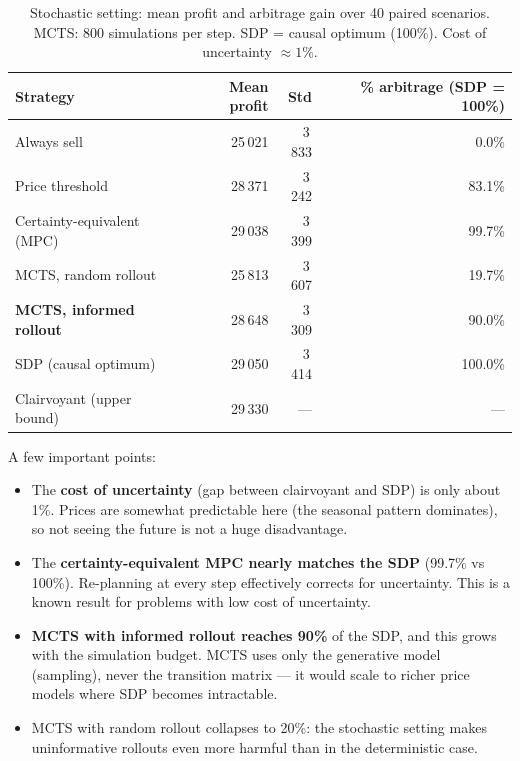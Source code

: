 \documentclass[12pt,a4paper]{article}
\begin{document}
\begin{table}[H]
  \centering
  \caption{Stochastic setting: mean profit and arbitrage gain over 40 paired
           scenarios. MCTS: 800 simulations per step.
           SDP = causal optimum (100\%). Cost of uncertainty $\approx 1\%$.}
  \label{tab:stoch_results}
  \begin{tabular}{lrrr}
    \toprule
    Strategy & Mean profit & Std & \% arbitrage (SDP = 100\%) \\
    \midrule
    Always sell                & 25\,021 & 3\,833 &   0.0\% \\
    Price threshold            & 28\,371 & 3\,242 &  83.1\% \\
    Certainty-equivalent (MPC) & 29\,038 & 3\,399 &  99.7\% \\
    MCTS, random rollout       & 25\,813 & 3\,607 &  19.7\% \\
    \textbf{MCTS, informed rollout} & 28\,648 & 3\,309 & 90.0\% \\
    SDP (causal optimum)       & 29\,050 & 3\,414 & 100.0\% \\
    \midrule
    Clairvoyant (upper bound)  & 29\,330 & --- & --- \\
    \bottomrule
  \end{tabular}
\end{table}

A few important points:
\begin{itemize}
  \item The \textbf{cost of uncertainty} (gap between clairvoyant and SDP)
    is only about 1\%. Prices are somewhat predictable here (the seasonal
    pattern dominates), so not seeing the future is not a huge disadvantage.
  \item The \textbf{certainty-equivalent MPC nearly matches the SDP} (99.7\%
    vs 100\%). Re-planning at every step effectively corrects for uncertainty.
    This is a known result for problems with low cost of uncertainty.
  \item \textbf{MCTS with informed rollout reaches 90\%} of the SDP, and this
    grows with the simulation budget. MCTS uses only the generative model
    (sampling), never the transition matrix — it would scale to richer price
    models where SDP becomes intractable.
  \item MCTS with random rollout collapses to 20\%: the stochastic setting
    makes uninformative rollouts even more harmful than in the deterministic
    case.
\end{itemize}
\end{document}
